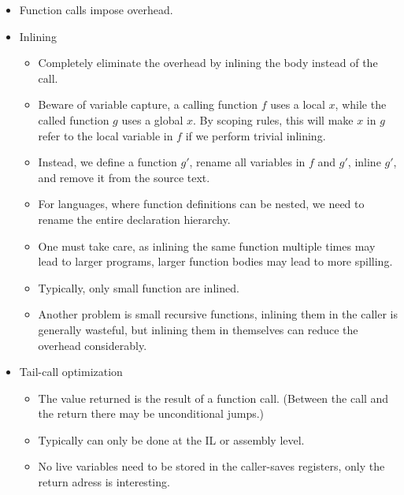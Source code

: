 \begin{itemize}

\item Function calls impose overhead.

\item Inlining

\begin{itemize}

\item Completely eliminate the overhead by inlining the body instead of the
call.

\item Beware of variable capture, a calling function $f$ uses a local $x$,
while the called function $g$ uses a global $x$. By scoping rules, this will
make $x$ in $g$ refer to the local variable in $f$ if we perform trivial
inlining.

\item Instead, we define a function $g'$, rename all variables in $f$ and $g'$,
inline $g'$, and remove it from the source text.

\item For languages, where function definitions can be nested, we need to
rename the entire declaration hierarchy.

\item One must take care, as inlining the same function multiple times may lead
to larger programs, larger function bodies may lead to more spilling.

\item Typically, only small function are inlined.

\item Another problem is small recursive functions, inlining them in the caller
is generally wasteful, but inlining them in themselves can reduce the overhead
considerably.

\end{itemize}

\item Tail-call optimization

\begin{itemize}

\item The value returned is the result of a function call. (Between the call
and the return there may be unconditional jumps.)

\item Typically can only be done at the IL or assembly level.

\item No live variables need to be stored in the caller-saves registers, only
the return adress is interesting.


\end{itemize}
\end{itemize}
